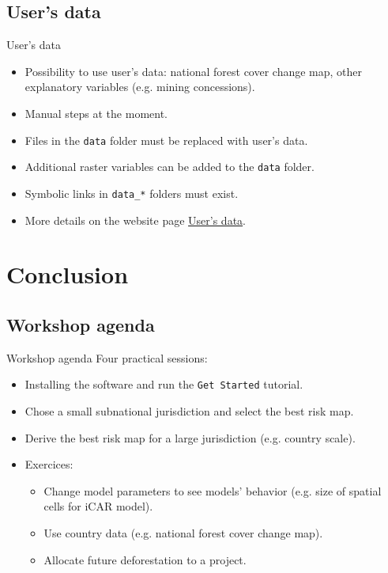 \documentclass[10pt,table,dvipsnames,compress]{beamer}
\begin{document}
\subsection{User's data}
\label{sec:org6992bcf}

\begin{frame}[label={sec:orgd079d9f},fragile]{User's data}
 \begin{itemize}
\item Possibility to use user's data: national forest cover change map, other explanatory variables (e.g. mining concessions).
\item Manual steps at the moment.
\item Files in the \texttt{data} folder must be replaced with user's data.
\item Additional raster variables can be added to the \texttt{data} folder.
\item Symbolic links in \texttt{data\_*} folders must exist.
\item More details on the website page \href{https://deforisk-qgis-plugin.org/articles/user\_data.html}{User's data}.
\end{itemize}
\end{frame}

\section{Conclusion}
\label{sec:org8b1578c}

\subsection{Workshop agenda}
\label{sec:org9e257b5}

\begin{frame}[label={sec:orgc45bd60},fragile]{Workshop agenda}
 Four practical sessions:

\begin{itemize}
\item Installing the software and run the \texttt{Get Started} tutorial.
\item Chose a small subnational jurisdiction and select the best risk map.
\item Derive the best risk map for a large jurisdiction (e.g. country scale).
\item Exercices:
\begin{itemize}
\item Change model parameters to see models' behavior (e.g. size of spatial cells for iCAR model).
\item Use country data (e.g. national forest cover change map).
\item Allocate future deforestation to a project.
\end{itemize}
\end{itemize}
\end{frame}
\end{document}
